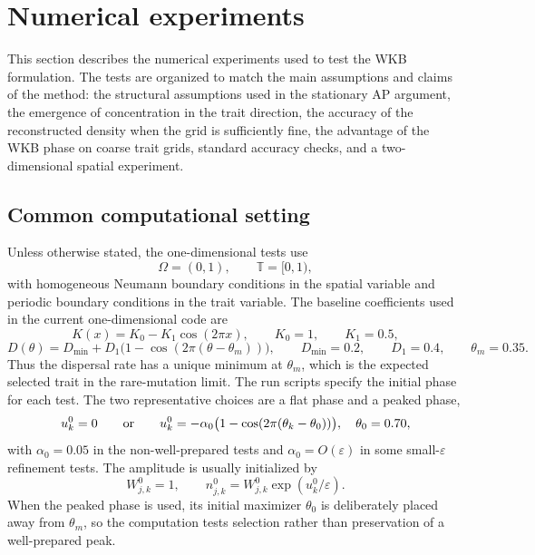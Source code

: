 \documentclass[11pt]{article}
\begin{document}


\section{Numerical experiments}\label{sec:numerics}

This section describes the numerical experiments used to test the WKB formulation.  The tests are organized to match the main assumptions and claims of the method: the structural assumptions used in the stationary AP argument, the emergence of concentration in the trait direction, the accuracy of the reconstructed density when the grid is sufficiently fine, the advantage of the WKB phase on coarse trait grids, standard accuracy checks, and a two-dimensional spatial experiment.

\subsection{Common computational setting}\label{subsec:numerical_common}

Unless otherwise stated, the one-dimensional tests use
\[
    \Omega=(0,1),\qquad \mathbb T=[0,1),
\]
with homogeneous Neumann boundary conditions in the spatial variable and periodic boundary conditions in the trait variable.  The baseline coefficients used in the current one-dimensional code are
\begin{equation}\label{eq:num_K_baseline_new}
    K(x)=K_0-K_1\cos(2\pi x),
    \qquad K_0=1,
    \qquad K_1=0.5,
\end{equation}
\begin{equation}\label{eq:num_D_baseline_new}
    D(\theta)=D_{\min}+D_1\bigl(1-\cos(2\pi(\theta-\theta_m))\bigr),
    \qquad D_{\min}=0.2,
    \qquad D_1=0.4,
    \qquad \theta_m=0.35.
\end{equation}
Thus the dispersal rate has a unique minimum at \(\theta_m\), which is the expected selected trait in the rare-mutation limit.  The run scripts specify the initial phase for each test.  The two representative choices are a flat phase and a peaked phase,
\begin{equation}\label{eq:num_initial_data_new}
    u_k^0=0
    \qquad\hbox{or}\qquad
    u_k^0=-\alpha_0\bigl(1-\cos(2\pi(\theta_k-\theta_0))\bigr),
    \quad \theta_0=0.70,
\end{equation}
with \(\alpha_0=0.05\) in the non-well-prepared tests and
\(\alpha_0=O(\varepsilon)\) in some small-\(\varepsilon\) refinement tests.  The amplitude is usually initialized by
\begin{equation}\label{eq:num_initial_W_new}
    W_{j,k}^0=1,
    \qquad
    n_{j,k}^0=W_{j,k}^0\exp(u_k^0/\varepsilon).
\end{equation}
When the peaked phase is used, its initial maximizer \(\theta_0\) is deliberately placed away from \(\theta_m\), so the computation tests selection rather than preservation of a well-prepared peak.
\end{document}
